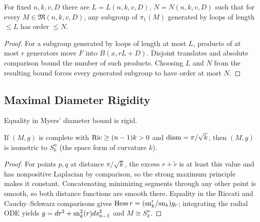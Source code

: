 \begin{lemma}
  \label{lem:pet-ch7-anderson-short-loops}
  For fixed $n,k,v,D$ there are $L=L(n,k,v,D)$, $N=N(n,k,v,D)$ such that for
  every $M\in\mathfrak{M}(n,k,v,D)$, any subgroup of $\pi_1(M)$ generated by
  loops of length $\le L$ has order $\le N$.
\end{lemma}
\begin{proof}
  \sketch
  For a subgroup generated by loops of length at most \(L\), products of at most \(r\) generators move \(F\) into \(B(x,rL+D)\). Disjoint translates and absolute comparison bound the number of such products. Choosing \(L\) and \(N\) from the resulting bound forces every generated subgroup to have order at most \(N\).
\end{proof}

\subsection{Maximal Diameter Rigidity}

Equality in Myers' diameter bound is rigid.

\begin{theorem}
  \label{thm:pet-ch7-cheng-rigidity}
  If $(M,g)$ is complete with $\operatorname{Ric}\ge(n-1)k>0$ and $\operatorname{diam}=\pi/\sqrt k$, then
  $(M,g)$ is isometric to $S^n_k$ (the space form of curvature $k$).
\end{theorem}
\begin{proof}
  \sketch
  For points \(p,q\) at distance \(\pi/\sqrt{k}\), the excess \(r+\widetilde r\) is at least this value and has nonpositive Laplacian by comparison, so the strong maximum principle makes it constant. Concatenating minimizing segments through any other point is smooth, so both distance functions are smooth there. Equality in the Riccati and Cauchy--Schwarz comparisons gives \(\operatorname{Hess} r=(\mathrm{sn}_k'/\mathrm{sn}_k)g_r\); integrating the radial ODE yields \(g=dr^2+\mathrm{sn}_k^2(r)ds_{n-1}^2\) and \(M\cong S_k^n\).
\end{proof}

